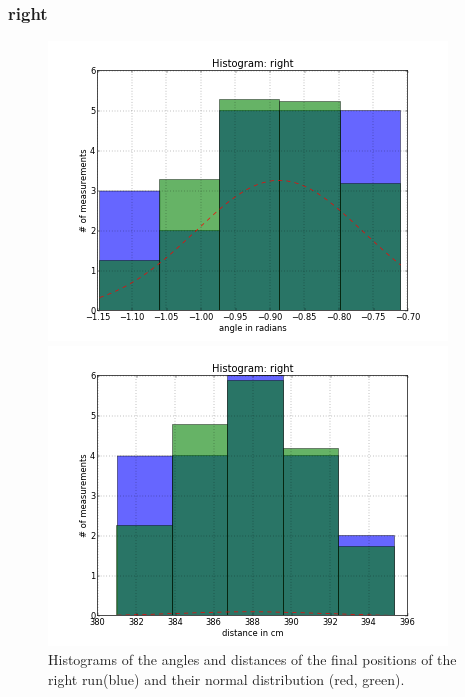 \documentclass{scrartcl}
\begin{document}
\subsubsection{right}

\begin{figure}[H]
\centering
\begin{minipage}{.5\textwidth}
  \centering
  \includegraphics[width=1.0\linewidth]{img/Angles_right_f.png}
\end{minipage}%
\begin{minipage}{.5\textwidth}
  \centering
  \includegraphics[width=1.0\linewidth]{img/Distances_right_f.png}
\end{minipage}
\caption{Histograms of the angles and distances of  the final positions of the right run(blue) and their normal distribution (red, green).}
\end{figure}
\end{document}
